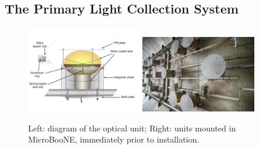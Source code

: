 


\subsection{The Primary Light Collection System}

\begin{figure}[t]
	\centering
           \includegraphics[width=0.45\textwidth]{./light_figures/PMTmount2.jpg} 
           \includegraphics[width=0.45\textwidth]{./light_figures/13-0430-05D.jpg} 
        \caption{Left: diagram of the optical unit; Right: units mounted in MicroBooNE, immediately prior to \lartpc installation.}\label{fig:unitmounted}
 
\end{figure}


